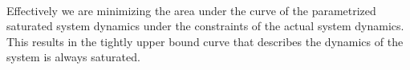 \begin{align}
        \label{eqn::optimization_prob}
\end{align}

Effectively we are minimizing the area under the curve of the parametrized saturated system dynamics under the
constraints of the actual system dynamics. This results in the tightly upper bound curve that describes the dynamics of
the system is always saturated.

